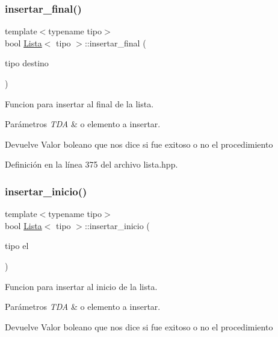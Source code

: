 \mbox{\label{classLista_a4ff75a84824729ce5af9d9f5d184020a}} 
\subsubsection{\texorpdfstring{insertar\+\_\+final()}{insertar\_final()}}
{\footnotesize\ttfamily template$<$typename tipo$>$ \\
bool \hyperlink{classLista}{Lista}$<$ tipo $>$\+::insertar\+\_\+final (\begin{DoxyParamCaption}\item[{tipo}]{destino }\end{DoxyParamCaption})}



Funcion para insertar al final de la lista. 


\begin{DoxyParams}{Parámetros}
{\em T\+DA} & o elemento a insertar. \\
\hline
\end{DoxyParams}
\begin{DoxyReturn}{Devuelve}
Valor boleano que nos dice si fue exitoso o no el procedimiento 
\end{DoxyReturn}


Definición en la línea 375 del archivo lista.\+hpp.

\mbox{\label{classLista_a4b6c7156fcd7ca69d5b12bcbb3312590}} 
\subsubsection{\texorpdfstring{insertar\+\_\+inicio()}{insertar\_inicio()}}
{\footnotesize\ttfamily template$<$typename tipo$>$ \\
bool \hyperlink{classLista}{Lista}$<$ tipo $>$\+::insertar\+\_\+inicio (\begin{DoxyParamCaption}\item[{tipo}]{el }\end{DoxyParamCaption})}



Funcion para insertar al inicio de la lista. 


\begin{DoxyParams}{Parámetros}
{\em T\+DA} & o elemento a insertar. \\
\hline
\end{DoxyParams}
\begin{DoxyReturn}{Devuelve}
Valor boleano que nos dice si fue exitoso o no el procedimiento 
\end{DoxyReturn}


